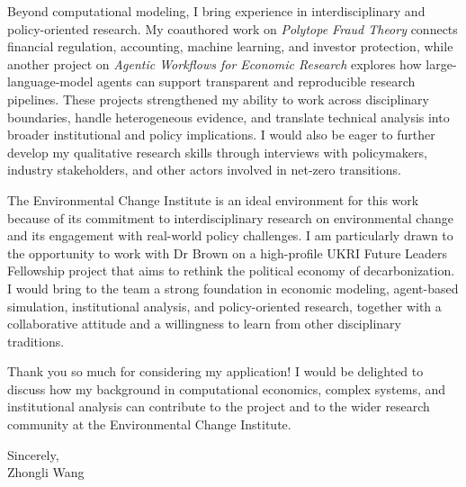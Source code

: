 \documentclass[11pt]{article}
\begin{document}
Beyond computational modeling, I bring experience in interdisciplinary and policy-oriented research. My coauthored work on \emph{Polytope Fraud Theory} connects financial regulation, accounting, machine learning, and investor protection, while another project on \emph{Agentic Workflows for Economic Research} explores how large-language-model agents can support transparent and reproducible research pipelines. These projects strengthened my ability to work across disciplinary boundaries, handle heterogeneous evidence, and translate technical analysis into broader institutional and policy implications. I would also be eager to further develop my qualitative research skills through interviews with policymakers, industry stakeholders, and other actors involved in net-zero transitions.

The Environmental Change Institute is an ideal environment for this work because of its commitment to interdisciplinary research on environmental change and its engagement with real-world policy challenges. I am particularly drawn to the opportunity to work with Dr Brown on a high-profile UKRI Future Leaders Fellowship project that aims to rethink the political economy of decarbonization. I would bring to the team a strong foundation in economic modeling, agent-based simulation, institutional analysis, and policy-oriented research, together with a collaborative attitude and a willingness to learn from other disciplinary traditions.

Thank you so much for considering my application! I would be delighted to discuss how my background in computational economics, complex systems, and institutional analysis can contribute to the project and to the wider research community at the Environmental Change Institute.

\vspace{0.35cm}

\noindent Sincerely,\\[0.95cm]
\noindent Zhongli Wang
\end{document}
